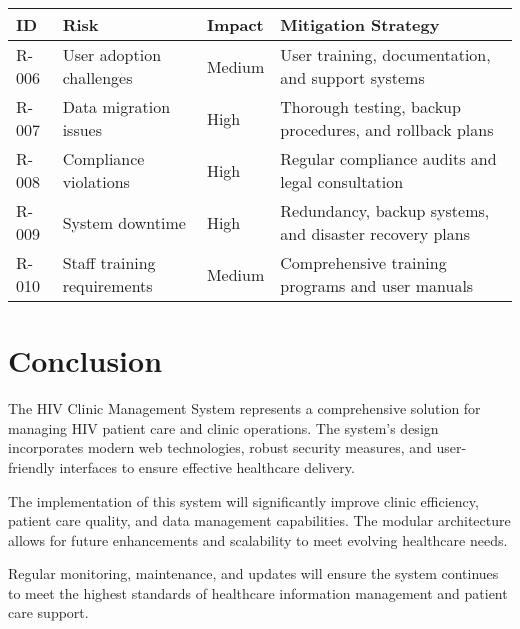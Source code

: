 \documentclass[12pt,a4paper]{article}
\begin{document}
\begin{longtable}{|p{1cm}|p{4cm}|p{2cm}|p{7cm}|}
\hline
\textbf{ID} & \textbf{Risk} & \textbf{Impact} & \textbf{Mitigation Strategy} \\
\hline
R-006 & User adoption challenges & Medium & User training, documentation, and support systems \\
\hline
R-007 & Data migration issues & High & Thorough testing, backup procedures, and rollback plans \\
\hline
R-008 & Compliance violations & High & Regular compliance audits and legal consultation \\
\hline
R-009 & System downtime & High & Redundancy, backup systems, and disaster recovery plans \\
\hline
R-010 & Staff training requirements & Medium & Comprehensive training programs and user manuals \\
\hline
\end{longtable}

\section{Conclusion}

The HIV Clinic Management System represents a comprehensive solution for managing HIV patient care and clinic operations. The system's design incorporates modern web technologies, robust security measures, and user-friendly interfaces to ensure effective healthcare delivery.

The implementation of this system will significantly improve clinic efficiency, patient care quality, and data management capabilities. The modular architecture allows for future enhancements and scalability to meet evolving healthcare needs.

Regular monitoring, maintenance, and updates will ensure the system continues to meet the highest standards of healthcare information management and patient care support.
\end{document}

